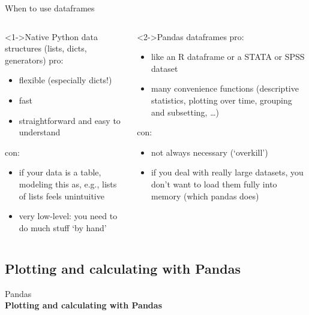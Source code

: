 \documentclass{beamer}
\begin{document}
\begin{frame}{When to use dataframes}
	\footnotesize
	\begin{columns}[t]
		
		\begin{block}<1->{Native Python data structures (lists, dicts, generators)}
		pro:
		\begin{itemize}
			\item flexible (especially dicts!)
			\item fast
			\item straightforward and easy to understand
		\end{itemize}
		con:
		\begin{itemize}
			\item if your data is a table, modeling this as, e.g., lists of lists feels unintuitive
			\item very low-level: you need to do much stuff `by hand'
		\end{itemize}
		
		\end{block}
		
		
		\begin{block}<2->{Pandas dataframes}
			pro:
			\begin{itemize}
				\item like an R dataframe or a STATA or SPSS dataset
				\item many convenience functions (descriptive statistics, plotting over time, grouping and subsetting, \ldots)
			\end{itemize}
			con:
			\begin{itemize}
				\item not always necessary (`overkill')
				\item if you deal with really large datasets, you don't want to load them fully into memory (which pandas does)
			\end{itemize}
			
		\end{block}
		
	\end{columns}
	
\end{frame}







\subsection{Plotting and calculating with Pandas}
\begin{frame}[plain]
	Pandas\\
	\textbf{Plotting and calculating with Pandas}
\end{frame}
\end{document}
